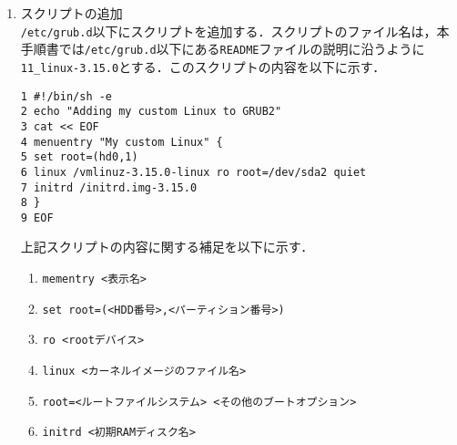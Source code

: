\documentclass[12pt]{jsarticle}
\begin{document}
\begin{enumerate}
\item スクリプトの追加\\
\verb|/etc/grub.d|以下にスクリプトを追加する．スクリプトのファイル名は，本手順書では\verb|/etc/grub.d|以下にある\verb|README|ファイルの説明に沿うように\verb|11_linux-3.15.0|とする．このスクリプトの内容を以下に示す．
    
\begin{verbatim}
1 #!/bin/sh -e
2 echo "Adding my custom Linux to GRUB2"
3 cat << EOF
4 menuentry "My custom Linux" {
5 set root=(hd0,1)
6 linux /vmlinuz-3.15.0-linux ro root=/dev/sda2 quiet
7 initrd /initrd.img-3.15.0
8 }
9 EOF
\end{verbatim}
上記スクリプトの内容に関する補足を以下に示す．
\begin{enumerate}
\item \verb|mementry <表示名>|
\item \verb|set root=(<HDD番号>,<パーティション番号>)|
\item \verb|ro <rootデバイス>|
\item \verb|linux <カーネルイメージのファイル名>|
\item \verb|root=<ルートファイルシステム> <その他のブートオプション>|
\item \verb|initrd <初期RAMディスク名>|
\end{enumerate}


\end{enumerate}
\end{document}

